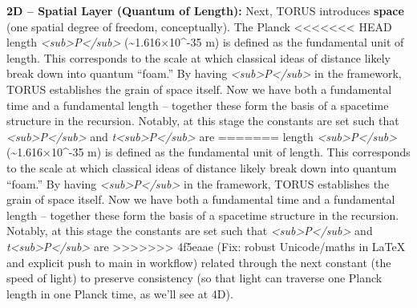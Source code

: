 \documentclass[]{article}
\begin{document}
\textbf{2D -- Spatial Layer (Quantum of Length):} Next, TORUS introduces
\textbf{space} (one spatial degree of freedom, conceptually). The Planck
<<<<<<< HEAD
length \emph{\ell\textless sub\textgreater P\textless/sub\textgreater{}}
(\textasciitilde1.616×10\^{}-35 m) is defined as the fundamental unit of
length. This corresponds to the scale at which classical ideas of
distance likely break down into quantum ``foam.'' By having
\emph{\ell\textless sub\textgreater P\textless/sub\textgreater{}} in the
framework, TORUS establishes the grain of space itself. Now we have both
a fundamental time and a fundamental length -- together these form the
basis of a spacetime structure in the recursion. Notably, at this stage
the constants are set such that
\emph{\ell\textless sub\textgreater P\textless/sub\textgreater{}} and
\emph{t\textless sub\textgreater P\textless/sub\textgreater{}} are
=======
length
\emph{\ell\textless{}sub\textgreater{}P\textless{}/sub\textgreater{}}
(\textasciitilde{}1.616×10\^{}-35 m) is defined as the fundamental unit
of length. This corresponds to the scale at which classical ideas of
distance likely break down into quantum ``foam.'' By having
\emph{\ell\textless{}sub\textgreater{}P\textless{}/sub\textgreater{}} in
the framework, TORUS establishes the grain of space itself. Now we have
both a fundamental time and a fundamental length -- together these form
the basis of a spacetime structure in the recursion. Notably, at this
stage the constants are set such that
\emph{\ell\textless{}sub\textgreater{}P\textless{}/sub\textgreater{}} and
\emph{t\textless{}sub\textgreater{}P\textless{}/sub\textgreater{}} are
>>>>>>> 4f5eaae (Fix: robust Unicode/maths in LaTeX and explicit push to main in workflow)
related through the next constant (the speed of light) to preserve
consistency (so that light can traverse one Planck length in one Planck
time, as we'll see at 4D).
\end{document}
